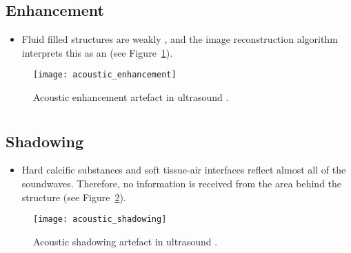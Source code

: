 \section*{}
\subsection{Enhancement}
\begin{itemize}
\item Fluid filled structures are weakly
  ,
  and the image reconstruction algorithm interprets this as an
   (see
  Figure~\ref{fig:acoustic_enhancement}).
\end{itemize}
\begin{figure}[!h]
  \centering
  \texttt{[image: acoustic\_enhancement]}
  \caption{Acoustic enhancement artefact in ultrasound
    \cite{abdulla2025ultrasound_artefacts}.\label{fig:acoustic_enhancement}}
\end{figure}

\section*{}
\subsection{Shadowing}
\begin{itemize}
\item Hard calcific substances and soft tissue-air interfaces reflect almost all of the soundwaves. Therefore, no information is received from the area behind the structure (see
  Figure~\ref{fig:acoustic_shadowing}).
\end{itemize}
\vspace{-1ex}
\begin{figure}[!h]
  \centering
  \texttt{[image: acoustic\_shadowing]}
  \caption{Acoustic shadowing artefact in ultrasound
    \cite{abdulla2025ultrasound_artefacts}.\label{fig:acoustic_shadowing}}
\end{figure}

\section*{}
